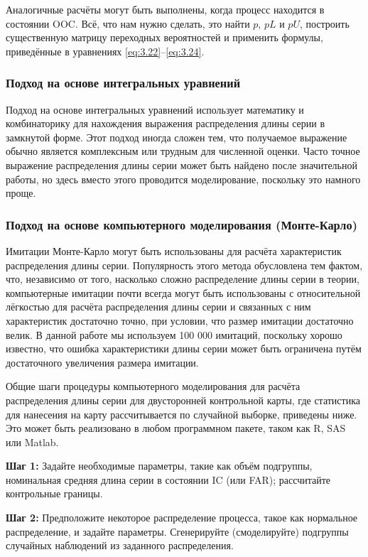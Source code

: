 Аналогичные расчёты могут быть выполнены, когда процесс находится в состоянии OOC. Всё, что нам нужно сделать, это найти \(p\), \(pL\) и \(pU\), построить существенную матрицу переходных вероятностей и применить формулы, приведённые в уравнениях \eqref{eq:3.22}–\eqref{eq:3.24}.

\subsubsection{Подход на основе интегральных уравнений}

Подход на основе интегральных уравнений использует математику и комбинаторику для нахождения выражения распределения длины серии в замкнутой форме. Этот подход иногда сложен тем, что получаемое выражение обычно является комплексным или трудным для численной оценки. Часто точное выражение распределения длины серии может быть найдено после значительной работы, но здесь вместо этого проводится моделирование, поскольку это намного проще.

\subsubsection{Подход на основе компьютерного моделирования (Монте-Карло)}

Имитации Монте-Карло могут быть использованы для расчёта характеристик распределения длины серии. Популярность этого метода обусловлена тем фактом, что, независимо от того, насколько сложно распределение длины серии в теории, компьютерные имитации почти всегда могут быть использованы с относительной лёгкостью для расчёта распределения длины серии и связанных с ним характеристик достаточно точно, при условии, что размер имитации достаточно велик. В данной работе мы используем 100 000 имитаций, поскольку хорошо известно, что ошибка характеристики длины серии может быть ограничена путём достаточного увеличения размера имитации.

Общие шаги процедуры компьютерного моделирования для расчёта распределения длины серии для двусторонней контрольной карты, где статистика для нанесения на карту рассчитывается по случайной выборке, приведены ниже. Это может быть реализовано в любом программном пакете, таком как R, SAS или Matlab.

\noindent\textbf{Шаг 1:} Задайте необходимые параметры, такие как объём подгруппы, номинальная средняя длина серии в состоянии IC (или FAR); рассчитайте контрольные границы.

\noindent\textbf{Шаг 2:} Предположите некоторое распределение процесса, такое как нормальное распределение, и задайте параметры. Сгенерируйте (смоделируйте) подгруппы случайных наблюдений из заданного распределения.

